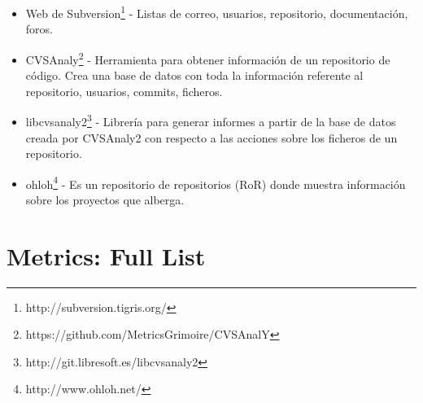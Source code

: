 \documentclass[11pt]{scrartcl}
\begin{document}
\begin{itemize}
    \item Web de Subversion\footnote{http://subversion.tigris.org/} - Listas de correo, usuarios, repositorio, documentaci\'on, foros.
    \item CVSAnaly\footnote{https://github.com/MetricsGrimoire/CVSAnalY} - Herramienta para obtener informaci\'on de un repositorio de c\'odigo. Crea una base de datos con toda la informaci\'on referente al repositorio, usuarios, commits, ficheros.
    \item libcvsanaly2\footnote{http://git.libresoft.es/libcvsanaly2} - Librer\'ia para generar informes a partir de la base de datos creada por CVSAnaly2 con respecto a las acciones sobre los ficheros de un repositorio.
    \item ohloh\footnote{http://www.ohloh.net/} - Es un repositorio de repositorios (RoR) donde muestra informaci\'on sobre los proyectos que alberga.

\end{itemize}

\section{Metrics: Full List}
\end{document}
